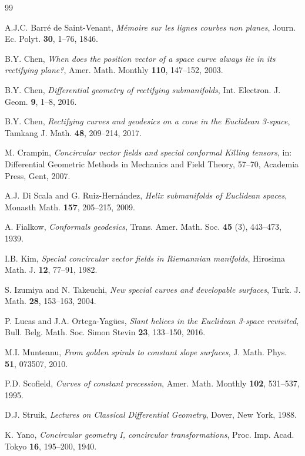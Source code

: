 \documentclass[eqnumis, pdf]{hjms}
\begin{document}

\begin{thebibliography}{99}
\def\autor#1{#1}
\def\titulo#1{\emph{#1}}
\def\referen#1{#1}
\def\vol#1{\textbf{#1}}
\def\sep{, }

\autor{A.J.C. Barré de Saint-Venant}\sep
\titulo{Mémoire sur les lignes courbes non planes}\sep
\referen{Journ. Ec. Polyt. \vol{30}, 1--76, 1846}.

\autor{B.Y. Chen}\sep
\titulo{When does the position vector of a space curve always lie in its rectifying plane?}\sep
\referen{Amer. Math. Monthly \vol{110}, 147--152, 2003}.

\autor{B.Y. Chen}\sep
\titulo{Differential geometry of rectifying submanifolds}\sep
\referen{Int. Electron. J. Geom. \vol{9}, 1--8, 2016}.

\autor{B.Y. Chen}\sep
\titulo{Rectifying curves and geodesics on a cone in the Euclidean 3-space}\sep
\referen{Tamkang J. Math. \vol{48}, 209--214, 2017}.

\autor{M. Crampin}\sep
\titulo{Concircular vector fields and special conformal Killing tensors}\sep
\referen{in: Differential Geometric Methods in Mechanics and Field Theory, 57--70, Academia Press, Gent, 2007}.

\autor{A.J. Di Scala and G. Ruiz-Hernández}\sep
\titulo{Helix submanifolds of Euclidean spaces}\sep
\referen{Monasth Math. \vol{157}, 205--215, 2009}.

\autor{A. Fialkow}\sep
\titulo{Conformals geodesics}\sep
\referen{Trans. Amer. Math. Soc. \vol{45} (3), 443--473, 1939}.

\autor{I.B. Kim}\sep
\titulo{Special concircular vector fields in Riemannian manifolds}\sep
\referen{Hirosima Math. J. \vol{12}, 77--91, 1982}.

\autor{S. Izumiya and N. Takeuchi}\sep
\titulo{New special curves and developable surfaces}\sep
\referen{Turk. J. Math. \vol{28}, 153--163, 2004}.

\autor{P. Lucas and J.A. Ortega-Yagües}\sep
\titulo{Slant helices in the Euclidean 3-space revisited}\sep
\referen{Bull. Belg. Math. Soc. Simon Stevin \vol{23}, 133--150, 2016}.

\autor{M.I. Munteanu}\sep
\titulo{From golden spirals to constant slope surfaces}\sep
\referen{J. Math. Phys. \vol{51}, 073507, 2010}.

\autor{P.D. Scofield}\sep
\titulo{Curves of constant precession}\sep
\referen{Amer. Math. Monthly \vol{102}, 531--537, 1995}.

\autor{D.J. Struik}\sep
\titulo{Lectures on Classical Differential Geometry}\sep
\referen{Dover, New York, 1988}.

\autor{K. Yano}\sep
\titulo{Concircular geometry I, concircular transformations}\sep
\referen{Proc. Imp. Acad. Tokyo \vol{16}, 195--200, 1940}.
\end{thebibliography}
\end{document}
